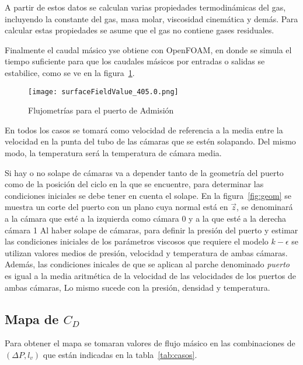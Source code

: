 A partir de estos datos se calculan varias propiedades termodinámicas del gas,
incluyendo la constante del gas, masa molar, viscosidad cinemática y demás.
%
Para calcular estas propiedades se asume que el gas no contiene gases
residuales.

Finalmente el caudal másico yse obtiene con OpenFOAM, en donde se simula el
tiempo suficiente para que los caudales másicos por entradas o salidas se
estabilice, como se ve en la figura~\ref{fig:caudalMasico}.

\begin{figure}
    \centering
    \texttt{[image: surfaceFieldValue\_405.0.png]}
    \caption{Flujometrías para el puerto de Admisión}\label{fig:caudalMasico}
\end{figure}
En todos los casos se tomará como velocidad de referencia a la media entre la
velocidad en la punta del tubo de las cámaras que se estén solapando.
%
Del mismo modo, la temperatura será la temperatura de cámara media.

Si hay o no solape de cámaras va a depender tanto de la geometría del puerto
como de la posición del ciclo en la que se encuentre, para determinar las
condiciones iniciales se debe tener en cuenta el solape.
%
En la figura~\ref{fig:geom} se muestra un corte del puerto con un plano cuya
normal está en $\vec{z}$, se denominará a la cámara que esté a la izquierda
como cámara 0 y a la que esté a la derecha cámara 1
%
Al haber solape de cámaras, para definir la presión del puerto y estimar las
condiciones iniciales de los parámetros viscosos que requiere el modelo
$k-\epsilon$ se utilizan valores medios de presión, velocidad y temperatura de
ambas cámaras.
%
Además, las condiciones inicales de que se aplican al parche denominado
\emph{puerto} es igual a la media aritmética de la velocidad de las velocidades
de los puertos de ambas cámaras, Lo mismo sucede con la presión, densidad y
temperatura.


\subsection{Mapa de $C_D$}
%
Para obtener el mapa se tomaran valores de flujo másico en las combinaciones de
$(\Delta P, l_v)$ que están indicadas en la tabla~\ref{tab:casos}.
%
%

